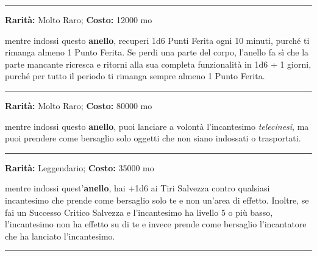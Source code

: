 \begin{multicols}{2}
\medskip

\smallskip\noindent\rule{\linewidth}{2pt}  \hypertarget{AnellodiRigenerazione}{}\medskip{}\noindent\label{AnellodiRigenerazione}

\textbf{Rarità:} Molto Raro; \textbf{Costo:} 12000 mo

mentre indossi questo \textbf{anello}, recuperi 1d6 Punti Ferita ogni 10 minuti, purché ti rimanga almeno 1 Punto Ferita. Se perdi una parte del corpo, l'anello fa sì che la parte mancante ricresca e ritorni alla sua completa funzionalità in 1d6 + 1 giorni, purché per tutto il periodo ti rimanga sempre almeno 1 Punto Ferita.

\smallskip\noindent\rule{\linewidth}{2pt}  \hypertarget{AnellodiTelecinesi}{}\medskip{}\noindent\label{AnellodiTelecinesi}

\textbf{Rarità:} Molto Raro; \textbf{Costo:} 80000 mo

mentre indossi questo \textbf{anello}, puoi lanciare a volontà l'incantesimo \emph{telecinesi}, ma puoi prendere come bersaglio solo oggetti che non siano indossati o trasportati.

\smallskip\noindent\rule{\linewidth}{2pt}  \hypertarget{AnelloRespingiIncantesimi}{}\medskip{}\noindent\label{AnelloRespingiIncantesimi}

\textbf{Rarità:} Leggendario; \textbf{Costo:} 35000 mo

mentre indossi quest'\textbf{anello}, hai +1d6 ai Tiri Salvezza contro qualsiasi incantesimo che prende come bersaglio solo te e non un'area di effetto. Inoltre, se fai un Successo Critico Salvezza e l'incantesimo ha livello 5 o più basso, l'incantesimo non ha effetto su di te e invece prende come bersaglio l'incantatore che ha lanciato l'incantesimo.

\smallskip\noindent\rule{\linewidth}{2pt}  \hypertarget{Anforaelementaledell'acqua}{}\medskip{}\noindent\label{Anforaelementaledell'acqua}


\end{multicols}
